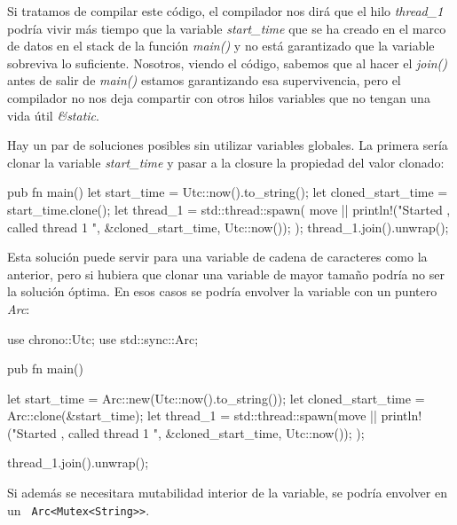 \documentclass[a4paper,11pt]{extarticle}
\begin{document}
Si tratamos de compilar este código, el compilador nos dirá que el hilo \textit{thread\_1} podría vivir más tiempo que la variable \textit{start\_time} que se ha creado en el marco de datos en el stack de la función \textit{main()} y no está garantizado que la variable sobreviva lo suficiente. Nosotros, viendo el código, sabemos que al hacer el \textit{join()} antes de salir de \textit{main()} estamos garantizando esa supervivencia, pero el compilador no nos deja compartir con otros hilos variables que no tengan una vida útil \textit{\&static}.

Hay un par de soluciones posibles sin utilizar variables globales. La primera sería clonar la variable \textit{start\_time} y pasar a la closure la propiedad del valor clonado:

\begin{Codigo2}
pub fn main() {
   let start_time = Utc::now().to_string();
   let cloned_start_time = start_time.clone();
   let thread_1 = std::thread::spawn( move ||{
      println!("Started {}, called thread 1 {}", &cloned_start_time, Utc::now());
   });
   thread_1.join().unwrap();
}	
\end{Codigo2}

Esta solución puede servir para una variable de cadena de caracteres como la anterior, pero si hubiera que clonar una variable de mayor tamaño podría no ser la solución óptima. En esos casos se podría envolver la variable con un puntero \textit{Arc}:



\begin{Codigo2}
use chrono::Utc;
use std::sync::Arc;

pub fn main() {
   let start_time = Arc::new(Utc::now().to_string());
   let cloned_start_time = Arc::clone(&start_time);
   let thread_1 = std::thread::spawn(move ||{
      println!("Started {}, called thread 1 {}", &cloned_start_time, Utc::now());
   });
	
   thread_1.join().unwrap();
}
\end{Codigo2}

Si además se necesitara mutabilidad interior de la variable, se podría envolver en un \verb+ Arc<Mutex<String>>+.
\end{document}
